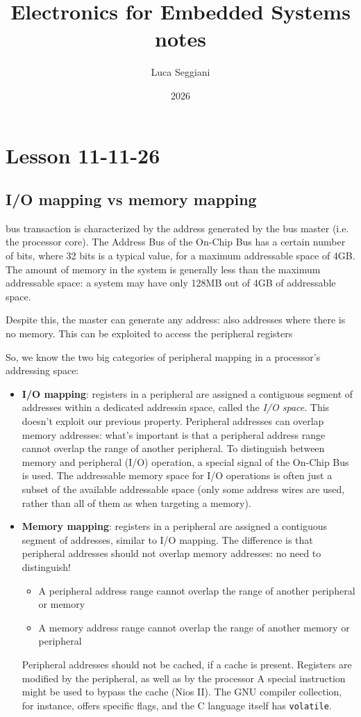 \documentclass[a4paper,11pt]{article}
\title{Electronics for Embedded Systems notes}
\author{Luca Seggiani}
\date{2026}
\begin{document}
\section{Lesson 11-11-26}

\thispagestyle{empty}
\pagestyle{fancy}

\subsection{I/O mapping vs memory mapping}

 bus transaction is characterized by the address generated by the bus master (i.e. the processor core).
The Address Bus of the On-Chip Bus has a certain number of bits, where 32 bits is a typical value, for a maximum addressable space of 4GB.
The amount of memory in the system is generally less than the maximum addressable space: a system may have only 128MB out of 4GB of addressable space.

Despite this, the master can generate any address: also addresses where there is no memory.
This can be exploited to access the peripheral registers

So, we know the two big categories of peripheral mapping in a processor's addressing space:
\begin{itemize}
	\item \textbf{I/O mapping}: registers in a peripheral are assigned a contiguous segment of addresses within a dedicated addressin space, called the \textit{I/O space}. This doesn't exploit our previous property. Peripheral addresses can overlap memory addresses: what's important is that a peripheral address range cannot overlap the range of another peripheral.
To distinguish between memory and peripheral (I/O) operation, a special signal of the On-Chip Bus is used.
The addressable memory space for I/O operations is often just a subset of the available addressable space (only some address wires are used, rather than all of them as when targeting a memory).
	\item \textbf{Memory mapping}: registers in a peripheral are assigned a contiguous segment of addresses, similar to I/O mapping. The difference is that peripheral addresses should not overlap memory addresses: no need to distinguish!
\begin{itemize}
	\item A peripheral address range cannot overlap the range of another peripheral or memory
	\item A memory address range cannot overlap the range of another memory or peripheral
\end{itemize}

Peripheral addresses should not be cached, if a cache is present.
Registers are modified by the peripheral, as well as by the processor
A special instruction might be used to bypass the cache (Nios II).
The GNU compiler collection, for instance, offers specific flags, and the C language itself has \texttt{volatile}.
\end{itemize}
\end{document}
